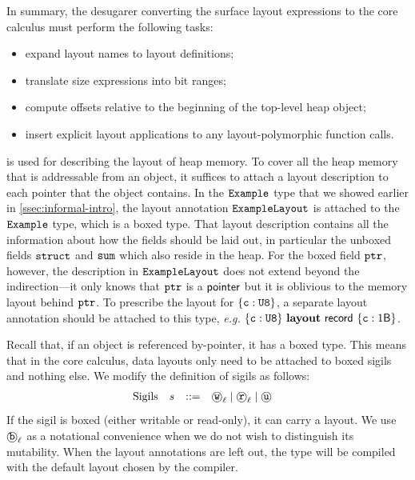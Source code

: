 In summary, the desugarer converting the surface layout expressions to
the core calculus must perform the following tasks:
\begin{itemize}
  \item expand layout names to layout definitions;
  \item translate size expressions into bit ranges;
  \item compute offsets relative to the beginning of the top-level
    heap object;
  \item insert explicit layout applications to any layout-polymorphic
    function calls.
\end{itemize}
\Dargent is used for describing the layout of heap memory. To cover all the
heap memory that is addressable from an object,
it suffices to attach a layout description to each pointer that the object contains.
In the $\texttt{Example}$ type that we showed earlier in \autoref{ssec:informal-intro},
the layout annotation $\texttt{ExampleLayout}$ is attached to the $\texttt{Example}$ type,
which is a boxed type. That layout description contains all the information about
how the fields should be laid out, in particular the unboxed fields $\texttt{struct}$ and
$\texttt{sum}$ which also reside in the heap. For the boxed field $\texttt{ptr}$, however,
the description in $\texttt{ExampleLayout}$ does not extend beyond the indirection---it only
knows that $\texttt{ptr}$ is a ${\mathsf{pointer}}$ but it is oblivious to the
memory layout behind $\texttt{ptr}$.
%
To prescribe the layout for $\{ \texttt{c} : \texttt{U8}\}$, a
separate layout annotation should be attached to this type, \emph{e.g.}
$\{ \texttt{c} : \texttt{U8} \}\ \mathbf{layout}\ \mathsf{record}\ \{ 
  \texttt{c} : 1\mathsf{B} \}$.

Recall that, if an object is referenced by-pointer, it has a boxed type.
This means that in the core calculus, data layouts only need to be attached to boxed sigils
and nothing else.
We modify the definition of sigils as follows:
$$
\begin{array}{llclr}
  \text{Sigils} & s & ::=  & \text{\textcircled{\texttt{w}}}_{\ell} \mid \text{\textcircled{\texttt{r}}}_{\ell} \mid \text{\textcircled{\texttt{u}}} &
\end{array}
$$
If the sigil is boxed (either writable or read-only), it can carry a \dargent layout.
We use $\text{\textcircled{\texttt{b}}}_{\ell}$ as a notational convenience when we do not wish
to distinguish its mutability.
When the layout annotations are left out, the type will be compiled with the default layout chosen
by the compiler.



